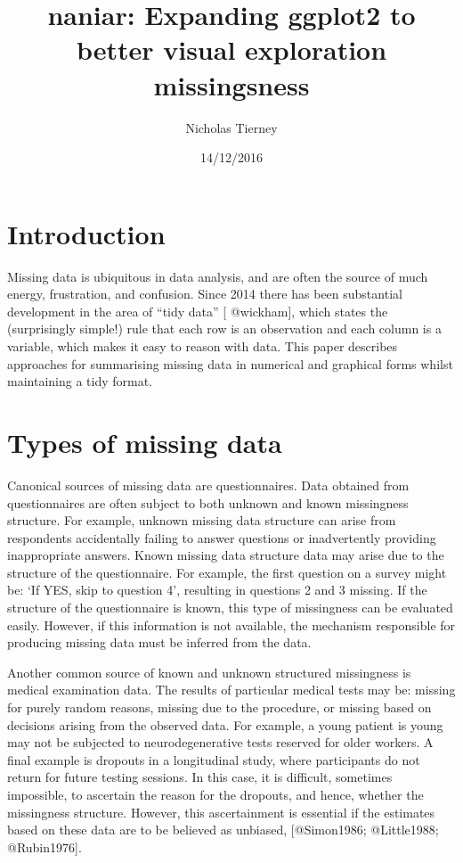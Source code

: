 \documentclass[]{article}
\title{naniar: Expanding ggplot2 to better visual exploration missingsness}
\author{Nicholas Tierney}
\date{14/12/2016}
\begin{document}
\maketitle

\section{Introduction}\label{introduction}

Missing data is ubiquitous in data analysis, and are often the source of
much energy, frustration, and confusion. Since 2014 there has been
substantial development in the area of ``tidy data'' {[} @wickham{]},
which states the (surprisingly simple!) rule that each row is an
observation and each column is a variable, which makes it easy to reason
with data. This paper describes approaches for summarising missing data
in numerical and graphical forms whilst maintaining a tidy format.

\section{Types of missing data}\label{types-of-missing-data}

Canonical sources of missing data are questionnaires. Data obtained from
questionnaires are often subject to both unknown and known missingness
structure. For example, unknown missing data structure can arise from
respondents accidentally failing to answer questions or inadvertently
providing inappropriate answers. Known missing data structure data may
arise due to the structure of the questionnaire. For example, the first
question on a survey might be: `If YES, skip to question 4', resulting
in questions 2 and 3 missing. If the structure of the questionnaire is
known, this type of missingness can be evaluated easily. However, if
this information is not available, the mechanism responsible for
producing missing data must be inferred from the data.

Another common source of known and unknown structured missingness is
medical examination data. The results of particular medical tests may
be: missing for purely random reasons, missing due to the procedure, or
missing based on decisions arising from the observed data. For example,
a young patient is young may not be subjected to neurodegenerative tests
reserved for older workers. A final example is dropouts in a
longitudinal study, where participants do not return for future testing
sessions. In this case, it is difficult, sometimes impossible, to
ascertain the reason for the dropouts, and hence, whether the
missingness structure. However, this ascertainment is essential if the
estimates based on these data are to be believed as unbiased,
{[}@Simon1986; @Little1988; @Rubin1976{]}.
\end{document}
